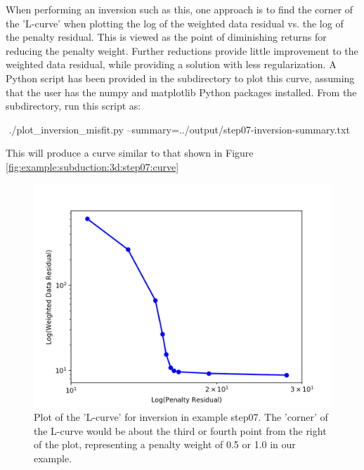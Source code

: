 When performing an inversion such as this, one approach is to find the
corner of the 'L-curve' when plotting the log of the weighted data
residual vs. the log of the penalty residual. This is viewed as the
point of diminishing returns for reducing the penalty
weight. Further reductions provide little improvement to the
weighted data residual, while providing a solution with less
regularization. A Python script has been provided in the
 subdirectory to plot this curve, assuming that the user
has the numpy and matplotlib Python packages installed. From the
 subdirectory, run this script as:
\begin{shell}
$$ ./plot_inversion_misfit.py
--summary=../output/step07-inversion-summary.txt
\end{shell}
This will produce a curve similar to that shown in Figure
\vref{fig:example:subduction:3d:step07:curve}
\begin{figure}
  \includegraphics[width=4.5in]{examples/figs/subduction3d_step07_inverse_curve}
  \caption{Plot of the 'L-curve' for inversion in example step07. The
    'corner' of the L-curve would be about the third or fourth point
    from the right of the plot, representing a penalty weight of 0.5
    or 1.0 in our example. }
  \label{fig:example:subduction:3d:step07:curve}
\end{figure}

